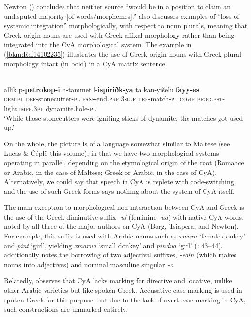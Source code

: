 \documentclass[output=paper]{langsci/langscibook}
\begin{document}
Newton (\citeyear[50]{Newton1964}) concludes that neither source “would be in a position to claim an undisputed majority [of words/morphemes].” \citet{Gulle2016} also discusses examples of “loss of systemic integration” morphologically, with respect to noun plurals, meaning that Greek-origin nouns are used with Greek affixal morphology rather than being integrated into the CyA morphological system. The example in (\ref{bkm:Ref14102235}) illustrates the use of Greek-origin nouns with Greek plural morphology intact (in bold) in a CyA matrix sentence.

\ea\label{bkm:Ref14102235}
\\
\gll allik p-\textbf{petrokop-i} n-tammet l-\textbf{ispiriðk-ya} ta kan-yišelu \textbf{fayy-es}\\
     \textsc{dem}.\textsc{pl} \textsc{def}{}-stonecutter-\textsc{pl} \textsc{pass-}end.\textsc{prf.3sg.f} \textsc{def-}match-\textsc{pl} \textsc{comp} \textsc{prog.pst-}light.\textsc{impf.3pl} dynamite.hole-\textsc{pl}\\
\glt ‘While those stonecutters were igniting sticks of dynamite, the matches got used up.’
\z

On the whole, the picture is of a language somewhat similar to Maltese (see Lucas \& Čéplö this volume), in that we have two morphological systems operating in parallel, depending on the etymological origin of the root (Romance or Arabic, in the case of Maltese; Greek or Arabic, in the case of CyA). Alternatively, we could say that speech in CyA is replete with code-switching, and the use of such Greek forms says nothing about the system of CyA itself.

The main exception to morphological non-interaction between CyA and Greek is the use of the Greek diminutive suffix \textit{{}-ui} (feminine \textit{{}-ua}) with native CyA words, noted by all three of the major authors on CyA (Borg, Tsiapera, and Newton). For example, this suffix is used with Arabic nouns such as \textit{xmara} ‘female donkey’ and \textit{pint} `girl', yielding \textit{xmarua} ‘small donkey’ and \textit{pindua} ‘girl’ (\citealt{Newton1964}: 43–44). \citet{Tsiapera1964} additionally notes the borrowing of two adjectival suffixes, \textit{{}-edin} (which makes nouns into adjectives) and nominal masculine singular \textit{{}-o}. 

Relatedly, \citet{Gulle2016} observes that CyA lacks marking for directive and locative, unlike other Arabic varieties but like spoken Greek. Accusative case marking is used in spoken Greek for this purpose, but due to the lack of overt case marking in CyA, such constructions are unmarked entirely. 
\end{document}
